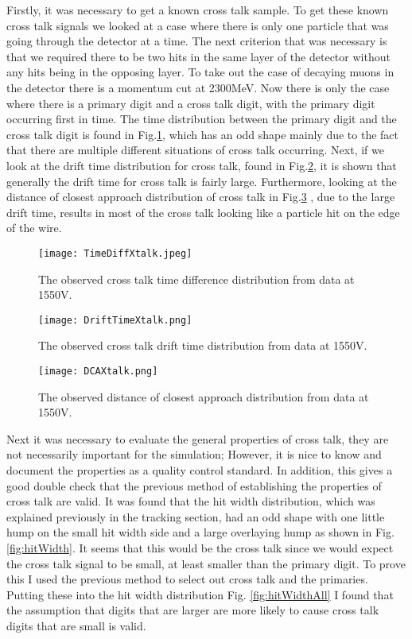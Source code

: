 \documentclass[./Thesis]{subfiles}
\begin{document}
	Firstly, it was necessary to get a known cross talk sample.  To get these known cross talk signals we looked at a case where there is only one particle that was going through the detector at a time.  The next criterion that was necessary is that we required there to be two hits in the same layer of the detector without any hits being in the opposing layer.  To take out the case of decaying muons in the detector there is a momentum cut at 2300MeV.  Now there is only the case where there is a primary digit and a cross talk digit, with the primary digit occurring first in time.  The time distribution between the primary digit and the cross talk digit is found in Fig.\ref{fig:TimeXtalk}, which has an odd shape mainly due to the fact that there are multiple different situations of cross talk occurring. Next, if we look at the drift time distribution for cross talk, found in Fig.\ref{fig:DriftXtalk}, it is shown that generally the drift time for cross talk is fairly large. Furthermore, looking at the distance of closest approach distribution of cross talk in Fig.\ref{fig:DCAXtalk} , due to the large drift time, results in most of the cross talk looking like a particle hit on the edge of the wire.
		
\begin{figure}
	\centerline{\texttt{[image: TimeDiffXtalk.jpeg]}}
	\caption[ Cross Talk Time Distribution]{ The observed cross talk time difference distribution from data at 1550V.}
	\label{fig:TimeXtalk}
\end{figure}

\begin{figure}
	\centerline{\texttt{[image: DriftTimeXtalk.png]}}
	\caption[ DriftTime Distribution of Cross Talk]{ The observed cross talk drift time distribution from data at 1550V.}
	\label{fig:DriftXtalk}
\end{figure}
	
\begin{figure}
	\centerline{\texttt{[image: DCAXtalk.png]}}
	\caption[ Distance of Closest Approach Distribution of Cross Talk]{ The observed distance of closest approach distribution from data at 1550V.}
	\label{fig:DCAXtalk}
\end{figure}
	
	Next it was necessary to evaluate the general properties of cross talk, they are not necessarily important for the simulation; However, it is nice to know and document the properties as a quality control standard. In addition, this gives a good double check that the previous method of establishing the properties of cross talk are valid. It was found that the hit width distribution, which was explained previously in the tracking section, had an odd shape with one little hump on the small hit width side and a large overlaying hump as shown in Fig. \ref{fig:hitWidth}. It seems that this would be the cross talk since we would expect the cross talk signal to be small, at least smaller than the primary digit. To prove this I used the previous method to select out cross talk and the primaries. Putting these into the hit width distribution Fig. \ref{fig:hitWidthAll} I found that the assumption that digits that are larger are more likely to cause cross talk digits that are small is valid. 
	
\end{document}
